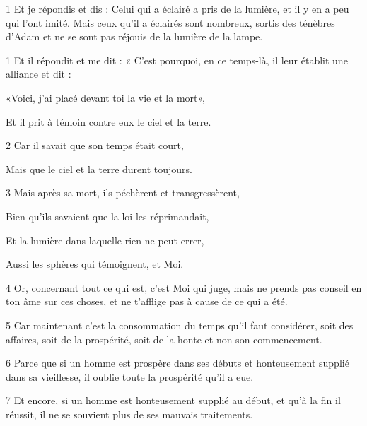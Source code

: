 
\par 1 Et je répondis et dis : Celui qui a éclairé a pris de la lumière, et il y en a peu qui l'ont imité. Mais ceux qu'il a éclairés sont nombreux, sortis des ténèbres d'Adam et ne se sont pas réjouis de la lumière de la lampe.


\par 1 Et il répondit et me dit : « C'est pourquoi, en ce temps-là, il leur établit une alliance et dit :

\par «Voici, j'ai placé devant toi la vie et la mort»,

\par Et il prit à témoin contre eux le ciel et la terre.

\par 2 Car il savait que son temps était court,

\par Mais que le ciel et la terre durent toujours.

\par 3 Mais après sa mort, ils péchèrent et transgressèrent,

\par Bien qu'ils savaient que la loi les réprimandait,

\par Et la lumière dans laquelle rien ne peut errer,

\par Aussi les sphères qui témoignent, et Moi.

\par 4 Or, concernant tout ce qui est, c'est Moi qui juge, mais ne prends pas conseil en ton âme sur ces choses, et ne t'afflige pas à cause de ce qui a été.

\par 5 Car maintenant c'est la consommation du temps qu'il faut considérer, soit des affaires, soit de la prospérité, soit de la honte et non son commencement.

\par 6 Parce que si un homme est prospère dans ses débuts et honteusement supplié dans sa vieillesse, il oublie toute la prospérité qu'il a eue.

\par 7 Et encore, si un homme est honteusement supplié au début, et qu'à la fin il réussit, il ne se souvient plus de ses mauvais traitements.

